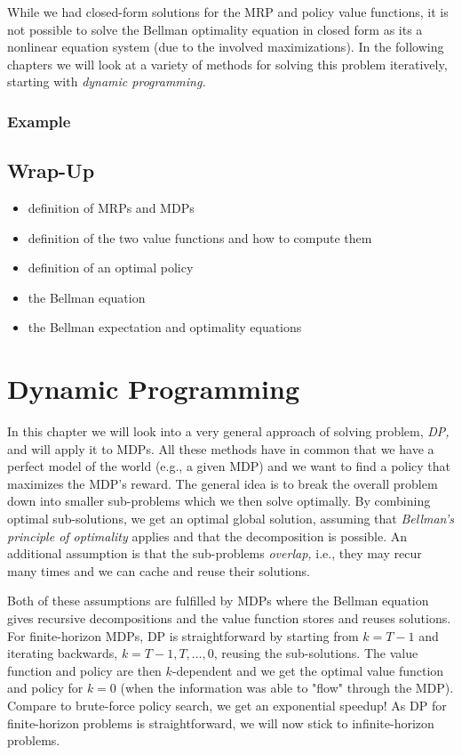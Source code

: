				While we had closed-form solutions for the \ac{MRP} and policy value functions, it is not possible to solve the Bellman optimality equation in closed form as its a nonlinear equation system (due to the involved maximizations). In the following chapters we will look at a variety of methods for solving this problem iteratively, starting with \emph{dynamic programming.}

		\subsection{Example} %

	\section{Wrap-Up}
		\begin{itemize}
			\item definition of \aclp{MRP} and \aclp{MDP}
			\item definition of the two value functions and how to compute them
			\item definition of an optimal policy
			\item the Bellman equation
			\item the Bellman expectation and optimality equations
		\end{itemize}

\chapter{Dynamic Programming}
	\label{c:dp}

	In this chapter we will look into a very general approach of solving problem, \emph{\ac{DP},} and will apply it to \acp{MDP}. All these methods have in common that we have a perfect model of the world (e.g., a given \ac{MDP}) and we want to find a policy that maximizes the \ac{MDP}'s reward. The general idea is to break the overall problem down into smaller sub-problems which we then solve optimally. By combining optimal sub-solutions, we get an optimal global solution, assuming that \emph{Bellman's principle of optimality} applies and that the decomposition is possible. An additional assumption is that the sub-problems \emph{overlap,} i.e., they may recur many times and we can cache and reuse their solutions.

	Both of these assumptions are fulfilled by \acp{MDP} where the Bellman equation gives recursive decompositions and the value function stores and reuses solutions. For finite-horizon \acp{MDP}, \ac{DP} is straightforward by starting from \(k = T - 1\) and iterating backwards, \(k = T - 1, T, \dots, 0\), reusing the sub-solutions. The value function and policy are then \(k\)-dependent and we get the optimal value function and policy for \(k = 0\) (when the information was able to "flow" through the \ac{MDP}). Compare to brute-force policy search, we get an exponential speedup! As \ac{DP} for finite-horizon problems is straightforward, we will now stick to infinite-horizon problems.

